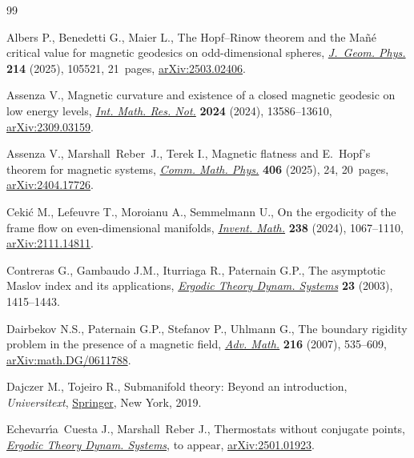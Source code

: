 \begin{thebibliography}{99}
\footnotesize\itemsep=0pt

Albers P., Benedetti G., Maier L., The {H}opf--{R}inow theorem and the
 {M}a\~{n}\'{e} critical value for magnetic geodesics on odd-dimensional
 spheres,
 \href{https://doi.org/10.1016/j.geomphys.2025.105521}{\textit{J.~Geom.
 Phys.}} \textbf{214} (2025), 105521, 21~pages,
 \href{http://arxiv.org/abs/2503.02406}{arXiv:2503.02406}.

Assenza V., Magnetic curvature and existence of a closed magnetic geodesic on
 low energy levels, \href{https://doi.org/10.1093/imrn/rnae209}{\textit{Int.
 Math. Res. Not.}} \textbf{2024} (2024), 13586--13610,
 \href{http://arxiv.org/abs/2309.03159}{arXiv:2309.03159}.

Assenza V., Marshall~Reber~J., Terek I., Magnetic flatness and {E}.~{H}opf's theorem
 for magnetic systems,
 \href{https://doi.org/10.1007/s00220-024-05166-5}{\textit{Comm. Math. Phys.}}
 \textbf{406} (2025), 24, 20~pages,
 \href{http://arxiv.org/abs/2404.17726}{arXiv:2404.17726}.

Ceki\'{c} M., Lefeuvre T., Moroianu A., Semmelmann U., On the ergodicity of the
 frame flow on even-dimensional manifolds,
 \href{https://doi.org/10.1007/s00222-024-01297-7}{\textit{Invent. Math.}}
 \textbf{238} (2024), 1067--1110,
 \href{http://arxiv.org/abs/2111.14811}{arXiv:2111.14811}.

Contreras G., Gambaudo J.M., Iturriaga R., Paternain G.P., The asymptotic
 {M}aslov index and its applications,
 \href{https://doi.org/10.1017/S0143385703000063}{\textit{Ergodic Theory
 Dynam. Systems}} \textbf{23} (2003), 1415--1443.

Dairbekov N.S., Paternain G.P., Stefanov P., Uhlmann G., The boundary rigidity
 problem in the presence of a magnetic field,
 \href{https://doi.org/10.1016/j.aim.2007.05.014}{\textit{Adv. Math.}}
 \textbf{216} (2007), 535--609,
 \href{http://arxiv.org/abs/math.DG/0611788}{arXiv:math.DG/0611788}.

Dajczer M., Tojeiro R., Submanifold theory: {B}eyond an introduction,
 \textit{Universitext}, \href{https://doi.org/10.1007/978-1-4939-9644-5}{Springer}, New
 York, 2019.

Echevarr\'{\i}a~Cuesta J., Marshall~Reber J., Thermostats without conjugate
 points, \href{http://dx.doi.org/10.1017/etds.2026.10285}{\textit{Ergodic
 Theory Dynam. Systems}}, {t}o appear,
 \href{http://arxiv.org/abs/2501.01923}{arXiv:2501.01923}.


\end{thebibliography}
